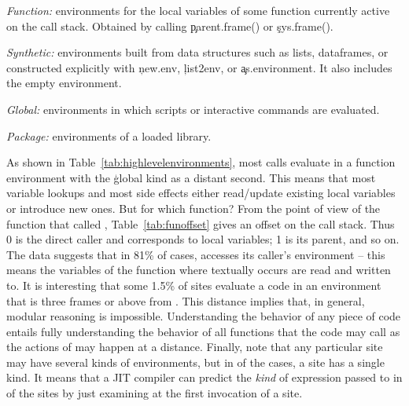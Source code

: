 \documentclass[review,screen,acmsmall,anonymous=true]{acmart}
\begin{document}
\begin{compactitem}[---]
\item \emph{Function:} environments for the local variables of some function
  currently active on the call stack. Obtained by calling \c{parent.frame()} or
  \c{sys.frame()}.
\item \emph{Synthetic:} environments built from data structures such as lists,
  dataframes, or constructed explicitly with \c{new.env}, \c{list2env}, or
  \c{as.environment}. It also includes the empty environment.
\item \emph{Global:}  environments in which scripts or interactive commands
  are evaluated.
\item \emph{Package:}  environments of a loaded library.
\end{compactitem}

\noindent
As shown in Table~\ref{tab:highlevelenvironments}, most calls evaluate in a
function environment with the \c{global} kind as a distant second. This means
that most variable lookups and most side effects either read/update existing
local variables or introduce new ones. But for which function? From the point of
view of the function that called \eval, Table~\ref{tab:funoffset} gives an
offset on the call stack. Thus 0 is the direct caller and corresponds to local variables; 1 is its parent, and so on. The data suggests that in 81\% of cases, \eval accesses its caller's environment -- this means  the variables of the function where \eval textually
occurs are read and written to. It is interesting that some 1.5\% of sites
evaluate a code in an environment that is three frames or above from \eval. This
distance implies that, in general, modular reasoning is impossible. Understanding the behavior of any piece of code entails fully understanding the
behavior of all functions that the code may call as the actions of \eval may
happen at a distance. Finally, note that any particular site may have several
kinds of environments, but in \packageNbOneCategoryEnvirSitePercent of the cases,  a site has a single kind. It means that a JIT compiler can predict the \emph{kind} of  expression passed to \eval in \packageNbOneCategoryEnvirSitePercent of the sites by just examining at the first invocation of a site.
\end{document}
